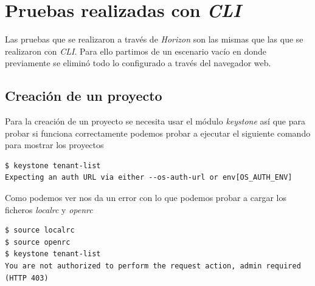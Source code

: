 \documentclass{article}
\begin{document}
\clearpage
\section{Pruebas realizadas con \emph{CLI}}

	Las pruebas que se realizaron a través de \emph{Horizon} son las mismas que las que se realizaron con \emph{CLI}\cite{CLI}.
Para ello partimos de un escenario vacío en donde previamente se eliminó todo lo configurado a través del navegador web.

\subsection{Creación de un proyecto}

	Para la creación de un proyecto se necesita usar el módulo \emph{keystone} así que para probar si funciona correctamente podemos probar a ejecutar el siguiente comando para mostrar los proyectos\cite{KeystoneCLIOpenStack}
\begin{lstlisting}[style=miniBash]
$ keystone tenant-list
Expecting an auth URL via either --os-auth-url or env[OS_AUTH_ENV]
\end{lstlisting}	

	Como podemos ver nos da un error con lo que podemos probar a cargar los ficheros \emph{localrc} y \emph{openrc}
\begin{lstlisting}[style=miniBash]
$ source localrc
$ source openrc
$ keystone tenant-list
You are not authorized to perform the request action, admin required (HTTP 403)
\end{lstlisting}		
\end{document}
